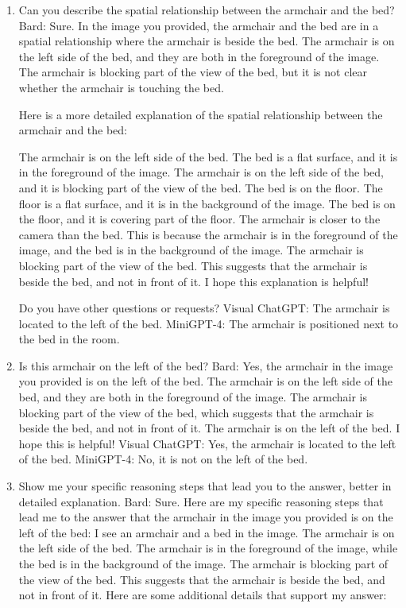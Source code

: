 \begin{enumerate}
    \item Can you describe the spatial relationship between the armchair and the bed?
    \subitem Bard: 
    Sure. In the image you provided, the armchair and the bed are in a spatial relationship where the armchair is beside the bed. The armchair is on the left side of the bed, and they are both in the foreground of the image. The armchair is blocking part of the view of the bed, but it is not clear whether the armchair is touching the bed.
    
    Here is a more detailed explanation of the spatial relationship between the armchair and the bed:
    
    The armchair is on the left side of the bed. The bed is a flat surface, and it is in the foreground of the image. The armchair is on the left side of the bed, and it is blocking part of the view of the bed.
    The bed is on the floor. The floor is a flat surface, and it is in the background of the image. The bed is on the floor, and it is covering part of the floor.
    The armchair is closer to the camera than the bed. This is because the armchair is in the foreground of the image, and the bed is in the background of the image.
    The armchair is blocking part of the view of the bed. This suggests that the armchair is beside the bed, and not in front of it.
    I hope this explanation is helpful!
    
    Do you have other questions or requests?
    \subitem Visual ChatGPT: The armchair is located to the left of the bed.
    \subitem MiniGPT-4: The armchair is positioned next to the bed in the room.
    \item Is this armchair on the left of the bed?
    \subitem Bard: 
    Yes, the armchair in the image you provided is on the left of the bed. The armchair is on the left side of the bed, and they are both in the foreground of the image. The armchair is blocking part of the view of the bed, which suggests that the armchair is beside the bed, and not in front of it. The armchair is on the left of the bed.
    I hope this is helpful!
    \subitem Visual ChatGPT: Yes, the armchair is located to the left of the bed.
    \subitem MiniGPT-4: No, it is not on the left of the bed.
    \item Show me your specific reasoning steps that lead you to the answer, better in detailed explanation.
    \subitem Bard: 
    Sure. Here are my specific reasoning steps that lead me to the answer that the armchair in the image you provided is on the left of the bed:
    I see an armchair and a bed in the image.
    The armchair is on the left side of the bed.
    The armchair is in the foreground of the image, while the bed is in the background of the image.
    The armchair is blocking part of the view of the bed. This suggests that the armchair is beside the bed, and not in front of it.
    Here are some additional details that support my answer:


\end{enumerate}
